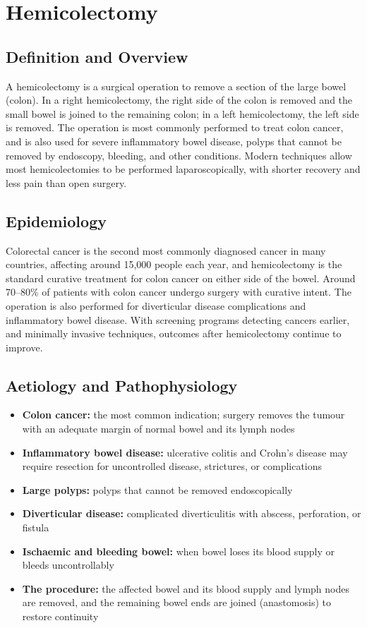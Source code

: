 \chapter{Hemicolectomy}

\section*{Definition and Overview}
A hemicolectomy is a surgical operation to remove a section of the large bowel (colon). In a right hemicolectomy, the right side of the colon is removed and the small bowel is joined to the remaining colon; in a left hemicolectomy, the left side is removed. The operation is most commonly performed to treat colon cancer, and is also used for severe inflammatory bowel disease, polyps that cannot be removed by endoscopy, bleeding, and other conditions. Modern techniques allow most hemicolectomies to be performed laparoscopically, with shorter recovery and less pain than open surgery.

\section*{Epidemiology}
Colorectal cancer is the second most commonly diagnosed cancer in many countries, affecting around 15,000 people each year, and hemicolectomy is the standard curative treatment for colon cancer on either side of the bowel. Around 70--80\% of patients with colon cancer undergo surgery with curative intent. The operation is also performed for diverticular disease complications and inflammatory bowel disease. With screening programs detecting cancers earlier, and minimally invasive techniques, outcomes after hemicolectomy continue to improve.

\section*{Aetiology and Pathophysiology}
\begin{itemize}
    \item \textbf{Colon cancer:} the most common indication; surgery removes the tumour with an adequate margin of normal bowel and its lymph nodes
    \item \textbf{Inflammatory bowel disease:} ulcerative colitis and Crohn's disease may require resection for uncontrolled disease, strictures, or complications
    \item \textbf{Large polyps:} polyps that cannot be removed endoscopically
    \item \textbf{Diverticular disease:} complicated diverticulitis with abscess, perforation, or fistula
    \item \textbf{Ischaemic and bleeding bowel:} when bowel loses its blood supply or bleeds uncontrollably
    \item \textbf{The procedure:} the affected bowel and its blood supply and lymph nodes are removed, and the remaining bowel ends are joined (anastomosis) to restore continuity
\end{itemize}

